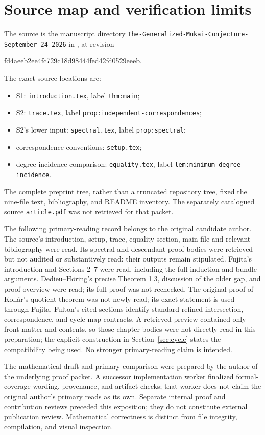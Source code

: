 \documentclass[11pt]{article}
\theoremstyle{definition}\newtheorem{definition}[theorem]{Definition}
\theoremstyle{remark}\newtheorem{remark}[theorem]{Remark}
\begin{document}
\section{Source map and verification limits}\label{sec:sources}
The source is the manuscript directory
\texttt{The-Generalized-Mukai-Conjecture-September-24-2026} in
\cite{source}, at revision
\begin{center}\small\ttfamily
fd4aeeb2ee4fc729c18d98444fed42fd0529eeeb.
\end{center}
The exact source locations are:
\begin{itemize}
\item S1: \texttt{introduction.tex}, label \texttt{thm:main};
\item S2: \texttt{trace.tex}, label \texttt{prop:independent-correspondences};
\item S2's lower input: \texttt{spectral.tex}, label \texttt{prop:spectral};
\item correspondence conventions: \texttt{setup.tex};
\item degree-incidence comparison: \texttt{equality.tex}, label
\texttt{lem:minimum-degree-incidence}.
\end{itemize}
The complete preprint tree, rather than a truncated repository tree, fixed
the nine-file text, bibliography, and README inventory. The separately
catalogued source \texttt{article.pdf} was not retrieved for that packet.

The following primary-reading record belongs to the original candidate
author. The source's introduction, setup, trace, equality section, main file and
relevant bibliography were read. Its spectral and descendant proof bodies
were retrieved but not audited or substantively read: their outputs remain
stipulated. Fujita's introduction and Sections 2--7 were read, including
the full induction and bundle arguments. Dedieu--H\"oring's precise
Theorem 1.3, discussion of the older gap, and proof overview were read;
its full proof was not rechecked. The original proof of Koll\'ar's quotient
theorem was not newly read; its exact statement is used through Fujita.
Fulton's cited sections identify standard refined-intersection,
correspondence, and cycle-map contracts. A retrieved preview contained
only front matter and contents, so those chapter bodies were not directly
read in this preparation; the explicit construction in
Section~\ref{sec:cycle} states the compatibility being used. No stronger
primary-reading claim is intended.

The mathematical draft and primary comparison were prepared by the author
of the underlying proof packet. A successor implementation worker finalized
formal-coverage wording, provenance, and artifact checks; that worker does
not claim the original author's primary reads as its own.
Separate internal proof and contribution reviews preceded this exposition;
they do not constitute external publication review. Mathematical correctness
is distinct from file integrity, compilation, and visual inspection.

\end{document}
